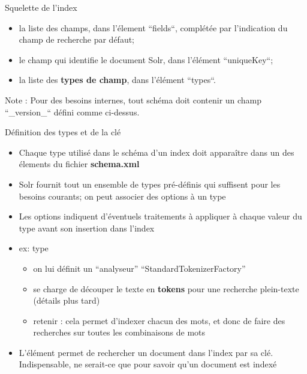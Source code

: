 \begin{frame}{Squelette de l'index}

  \begin{itemize}
    \item la liste des champs, dans l'élement ``fields``, complétée par l'indication du champ de recherche par défaut;
    \item le champ qui identifie le document Solr, dans l'élément ``uniqueKey``;
    \item la liste des {\bf types de champ}, dans l'élément ``types``.
  \end{itemize}
  \bigskip
  Note : Pour des besoins internes, tout schéma doit contenir un champ ``\_version\_`` défini comme ci-dessus.
\end{frame} %

  
\begin{frame}{Définition des types et de la clé}
  \begin{itemize}
    \item Chaque type utilisé dans le schéma d'un index doit apparaître dans un
      des élements  du fichier {\bf schema.xml}
    \item Solr fournit tout un ensemble de types pré-définis qui suffisent pour      
      les besoins courants;  on peut associer des options à un type

        \item Les options indiquent d'éventuels traitements à appliquer                       
          à chaque valeur du type avant son insertion dans l'index
        \item ex: type 
      \begin{itemize}
        \item on lui définit un ``analyseur''  ``StandardTokenizerFactory''
        \item se charge de découper le texte en {\bf tokens} pour une recherche
          plein-texte (détails plus tard)
        \item retenir : cela permet d'indexer chacun des mots, et donc de faire
          des recherches sur toutes les combinaisons de mots
      \end{itemize}
    \item  L'élément   permet de rechercher un document dans
      l'index par sa clé. Indispensable, ne serait-ce que pour savoir qu'un
      document est indexé\\
  \end{itemize}

\end{frame}


